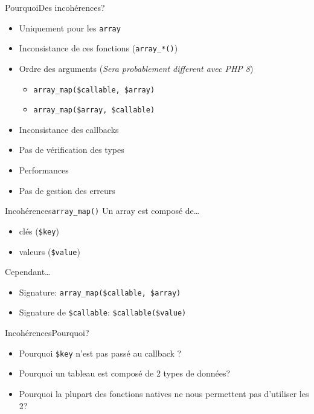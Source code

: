 \begin{frame}{Pourquoi}{Des incohérences?}
    \begin{itemize}[<+->]
        \item Uniquement pour les \texttt{array}
        \item Inconsistance de ces fonctions (\texttt{array\_*()})
        \item Ordre des arguments (\textit{Sera probablement different avec PHP 8})
        \begin{itemize}[<+->]
            \item \texttt{array\_map(\$callable, \$array)}
            \item \texttt{array\_map(\$array, \$callable)}
        \end{itemize}
        \item Inconsistance des callbacks
        \item Pas de vérification des types
        \item Performances
        \item Pas de gestion des erreurs
    \end{itemize}
\end{frame}

\begin{frame}{Incohérences}{\texttt{array\_map()}}
    Un array est composé de\ldots

    \begin{itemize}[<+->]
        \item clés (\texttt{\$key})
        \item valeurs (\texttt{\$value})
    \end{itemize}

    \pause

    Cependant\ldots

    \pause

    \begin{itemize}[<+->]
        \item Signature: \texttt{array\_map(\$callable, \$array)}
        \item Signature de \texttt{\$callable}: \texttt{\$callable(\$value)}
    \end{itemize}
\end{frame}

\begin{frame}{Incohérences}{Pourquoi?}
    \begin{itemize}[<+->]
        \item Pourquoi \texttt{\$key} n'est pas passé au callback ?
        \item Pourquoi un tableau est composé de 2 types de données?
        \item Pourquoi la plupart des fonctions natives ne nous permettent pas d'utiliser les 2?
    \end{itemize}
\end{frame}

